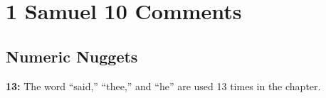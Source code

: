 \section{1 Samuel 10 Comments}

\subsection{Numeric Nuggets}
\textbf{13: } The word ``said,'' ``thee,'' and ``he'' are used 13 times in the chapter.